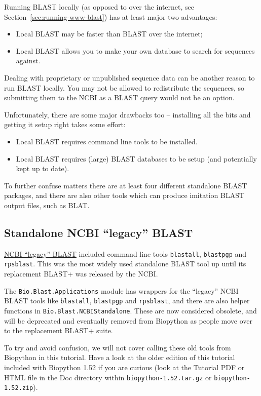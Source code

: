 \documentclass{report}
\begin{document}
Running BLAST locally (as opposed to over the internet, see
Section~\ref{sec:running-www-blast}) has at least major two advantages:
\begin{itemize}
\item Local BLAST may be faster than BLAST over the internet;
\item Local BLAST allows you to make your own database to search for sequences against.
\end{itemize}
Dealing with proprietary or unpublished sequence data can be another reason to run BLAST
locally.  You may not be allowed to redistribute the sequences, so submitting them to the
NCBI as a BLAST query would not be an option.

Unfortunately, there are some major drawbacks too -- installing all the bits and getting
it setup right takes some effort:
\begin{itemize}
\item Local BLAST requires command line tools to be installed.
\item Local BLAST requires (large) BLAST databases to be setup (and potentially kept up to date).
\end{itemize}

\noindent
To further confuse matters there are at least four different standalone BLAST packages,
and there are also other tools which can produce imitation BLAST output files, such as BLAT.

\subsection{Standalone NCBI ``legacy'' BLAST}

\href{http://blast.ncbi.nlm.nih.gov/Blast.cgi?CMD=Web&PAGE_TYPE=BlastDocs&DOC_TYPE=Download}
{NCBI ``legacy'' BLAST} included command line tools \verb|blastall|, \verb|blastpgp| and
\verb|rpsblast|. This was the most widely used standalone BLAST tool up until its replacement
BLAST+ was released by the NCBI.

The \verb|Bio.Blast.Applications| module has wrappers for the ``legacy'' NCBI BLAST tools
like \verb|blastall|, \verb|blastpgp| and \verb|rpsblast|, and there are also helper
functions in \verb|Bio.Blast.NCBIStandalone|. These are now considered obsolete, and will
be deprecated and eventually removed from Biopython as people move over to the replacement
BLAST+ suite.

To try and avoid confusion, we will not cover calling these old tools from Biopython
in this tutorial. Have a look at the older edition of this tutorial included with
Biopython 1.52 if you are curious (look at the Tutorial PDF or HTML file in the Doc
directory within \texttt{biopython-1.52.tar.gz} or \texttt{biopython-1.52.zip}).
\end{document}
